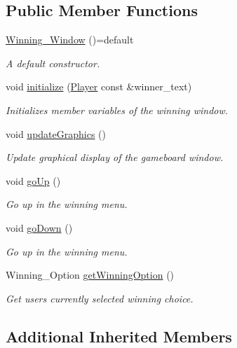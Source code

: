 \subsection*{Public Member Functions}
\begin{DoxyCompactItemize}
\item 
\hyperlink{classWinning__Window_adc2ffaa54ae59ffd3f50611dac1537b1}{Winning\+\_\+\+Window} ()=default
\begin{DoxyCompactList}\small\item\em A default constructor. \end{DoxyCompactList}\item 
void \hyperlink{classWinning__Window_a3382d7cac361e9909851407bf27efa58}{initialize} (\hyperlink{classPlayer}{Player} const \&winner_text)
\begin{DoxyCompactList}\small\item\em Initializes member variables of the winning window. \end{DoxyCompactList}\item 
void \hyperlink{classWinning__Window_a6daa7eec7198015a1f154cc9cb9b22c5}{update\+Graphics} ()
\begin{DoxyCompactList}\small\item\em Update graphical display of the gameboard window. \end{DoxyCompactList}\item 
void \hyperlink{classWinning__Window_a93f258448a7ab61ec6931e7bfb25b614}{go\+Up} ()
\begin{DoxyCompactList}\small\item\em Go up in the winning menu. \end{DoxyCompactList}\item 
void \hyperlink{classWinning__Window_ac6d149dfb7cd9c8978117eecd70a3923}{go\+Down} ()
\begin{DoxyCompactList}\small\item\em Go up in the winning menu. \end{DoxyCompactList}\item 
Winning\+\_\+\+Option \hyperlink{classWinning__Window_aaa8755d6751054b38c9eb3b085db4fdf}{get\+Winning\+Option} ()
\begin{DoxyCompactList}\small\item\em Get user\textquotesingle{}s currently selected winning choice. \end{DoxyCompactList}\end{DoxyCompactItemize}
\subsection*{Additional Inherited Members}


